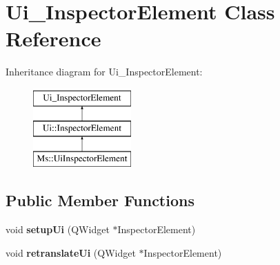 \hypertarget{class_ui___inspector_element}{}\section{Ui\+\_\+\+Inspector\+Element Class Reference}
\label{class_ui___inspector_element}
Inheritance diagram for Ui\+\_\+\+Inspector\+Element\+:\begin{figure}[H]
\begin{center}
\leavevmode
\includegraphics[height=3.000000cm]{class_ui___inspector_element}
\end{center}
\end{figure}
\subsection*{Public Member Functions}
\begin{DoxyCompactItemize}
\item 
\mbox{\label{class_ui___inspector_element_a059015c8dc6e0e03a58531f8b7b118b7}} 
void {\bfseries setup\+Ui} (Q\+Widget $\ast$Inspector\+Element)
\item 
\mbox{\label{class_ui___inspector_element_ae68bc7b4e0af71f4c2432b95a1823740}} 
void {\bfseries retranslate\+Ui} (Q\+Widget $\ast$Inspector\+Element)
\end{DoxyCompactItemize}
